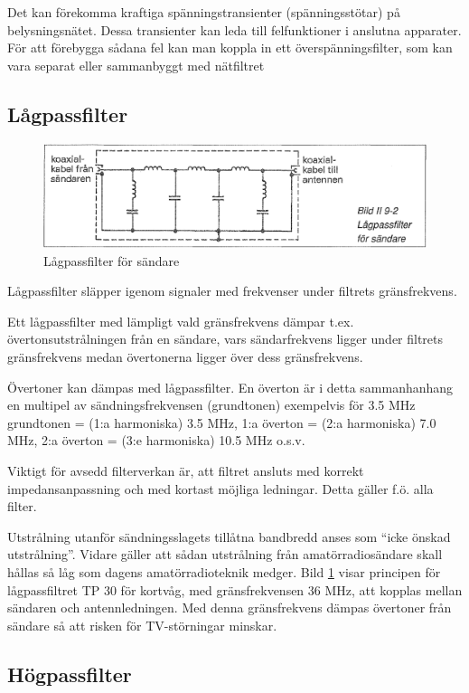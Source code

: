 Det kan förekomma kraftiga spänningstransienter (spänningsstötar) på
belysningsnätet. Dessa transienter kan leda till felfunktioner i
anslutna apparater. För att förebygga sådana fel kan man koppla in ett
överspänningsfilter, som kan vara separat eller sammanbyggt med
nätfiltret

\subsection{Lågpassfilter}

\begin{figure}
  \includegraphics[width=\textwidth]{images/bild_2_9-02}
  \caption{Lågpassfilter för sändare}
  \label{fig:bildII9-2}
\end{figure}

Lågpassfilter släpper igenom signaler med frekvenser under filtrets
gränsfrekvens.

Ett lågpassfilter med lämpligt vald gränsfrekvens dämpar
t.ex. övertonsutstrålningen från en sändare, vars sändarfrekvens
ligger under filtrets gränsfrekvens medan övertonerna ligger över dess
gränsfrekvens.

Övertoner kan dämpas med lågpassfilter. En överton är i detta
sammanhanhang en multipel av sändningsfrekvensen (grundtonen)
exempelvis för 3.5 MHz grundtonen = (1:a harmoniska) 3.5 MHz, 1:a
överton = (2:a harmoniska) 7.0 MHz, 2:a överton = (3:e harmoniska)
10.5 MHz o.s.v.

Viktigt för avsedd filterverkan är, att filtret ansluts med korrekt
impedansanpassning och med kortast möjliga ledningar. Detta gäller
f.ö. alla filter.

Utstrålning utanför sändningsslagets tillåtna bandbredd anses som
``icke önskad utstrålning''. Vidare gäller att sådan utstrålning från
amatörradiosändare skall hållas så låg som dagens amatörradioteknik
medger.  Bild \ref{fig:bildII9-2} visar principen för lågpassfiltret TP 30 för
kortvåg, med gränsfrekvensen 36 MHz, att kopplas mellan sändaren och
antennledningen. Med denna gränsfrekvens dämpas övertoner från sändare
så att risken för TV-störningar minskar.

\subsection{Högpassfilter}


